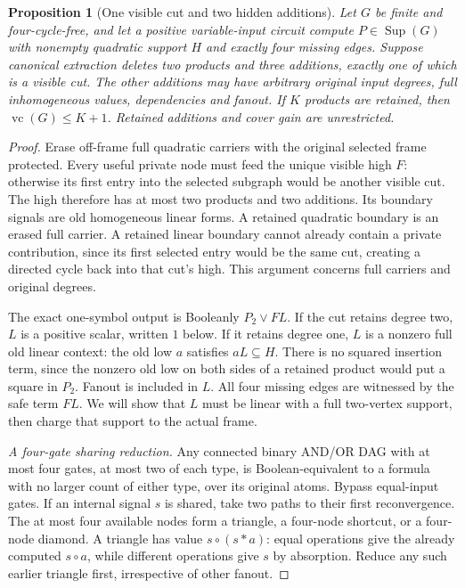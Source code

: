 \documentclass[11pt]{article}
\newcommand{\Sup}{\operatorname{Sup}}
\newcommand{\vc}{\operatorname{vc}}
\newtheorem{proposition}[theorem]{Proposition}
\theoremstyle{definition}
\theoremstyle{remark}
\begin{document}
\begin{proposition}[One visible cut and two hidden additions]
\label{prop:onevisibletwocover}
Let $G$ be finite and four-cycle-free, and let a positive variable-input
circuit compute $P\in\Sup(G)$ with nonempty quadratic support $H$ and
exactly four missing edges. Suppose canonical extraction deletes two
products and three additions, exactly one of which is a visible cut.
The other additions may have arbitrary original input degrees, full
inhomogeneous values, dependencies and fanout. If $K$ products are retained,
then $\vc(G)\le K+1$. Retained additions and cover gain are unrestricted.
\end{proposition}
\begin{proof}
Erase off-frame full quadratic carriers with the original selected frame
protected. Every useful private node must feed the unique visible high
$F$: otherwise its first entry into the selected subgraph would be another
visible cut. The high therefore has at most two products and two additions.
Its boundary signals are old homogeneous linear forms. A retained quadratic
boundary is an erased full carrier. A retained linear boundary cannot
already contain a private contribution, since its first selected entry
would be the same cut, creating a directed cycle back into that cut's high.
This argument concerns full carriers and original degrees.

The exact one-symbol output is Booleanly $P_2\vee FL$. If the cut
retains degree two, $L$ is a positive scalar, written $1$ below.
If it retains degree one, $L$ is a nonzero full old linear context:
the old low $a$ satisfies $aL\subseteq H$. There is no squared insertion
term, since the nonzero old low on both sides of a retained product would
put a square in $P_2$. Fanout is included in $L$. All four missing edges
are witnessed by the safe term $FL$. We will show that $L$ must be linear
with a full two-vertex support, then charge that support to the actual frame.

\emph{A four-gate sharing reduction.} Any connected binary AND/OR DAG
with at most four gates, at most two of each type, is Boolean-equivalent
to a formula with no larger count of either type, over its original atoms.
Bypass equal-input gates. If an internal signal $s$ is shared, take two
paths to their first reconvergence. The at most four available nodes form
a triangle, a four-node shortcut, or a four-node diamond. A triangle has
value $s\circ(s\mathbin{*}a)$: equal operations give the already computed
$s\circ a$, while different operations give $s$ by absorption.
Reduce any such earlier triangle first, irrespective of other fanout.


\end{proof}
\end{document}
